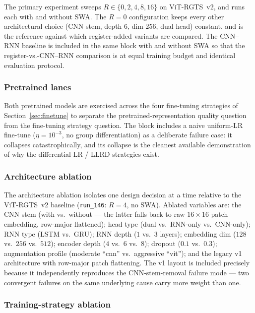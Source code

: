 The primary experiment sweeps $R \in \{0, 2, 4, 8, 16\}$ on ViT-RGTS~v2, and runs each with and without SWA. The $R = 0$ configuration keeps every other architectural choice (CNN stem, depth $6$, dim $256$, dual head) constant, and is the reference against which register-added variants are compared. The CNN--RNN baseline is included in the same block with and without SWA so that the register-vs.-CNN--RNN comparison is at equal training budget and identical evaluation protocol.

\subsubsection{Pretrained lanes}

Both pretrained models are exercised across the four fine-tuning strategies of Section~\ref{sec:finetune} to separate the pretrained-representation quality question from the fine-tuning strategy question. The block includes a naive uniform-LR fine-tune ($\eta = 10^{-3}$, no group differentiation) as a deliberate failure case: it collapses catastrophically, and its collapse is the cleanest available demonstration of why the differential-LR / LLRD strategies exist.

\subsubsection{Architecture ablation}

The architecture ablation isolates one design decision at a time relative to the ViT-RGTS~v2 baseline (\texttt{run\_146}: $R = 4$, no SWA). Ablated variables are: the CNN stem (with vs.\ without --- the latter falls back to raw $16 \times 16$ patch embedding, row-major flattened); head type (dual vs.\ RNN-only vs.\ CNN-only); RNN type (LSTM vs.\ GRU); RNN depth ($1$ vs.\ $3$ layers); embedding dim ($128$ vs.\ $256$ vs.\ $512$); encoder depth ($4$ vs.\ $6$ vs.\ $8$); dropout ($0.1$ vs.\ $0.3$); augmentation profile (moderate ``cnn'' vs.\ aggressive ``vit''); and the legacy v1 architecture with row-major patch flattening. The v1 layout is included precisely because it independently reproduces the CNN-stem-removal failure mode --- two convergent failures on the same underlying cause carry more weight than one.

\subsubsection{Training-strategy ablation}

